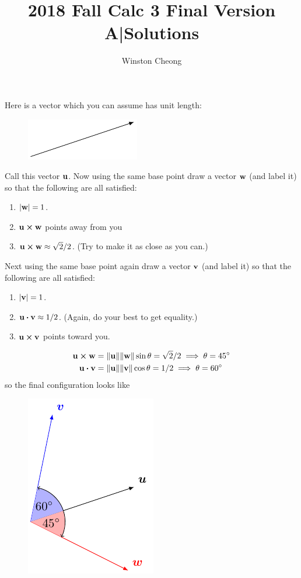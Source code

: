\documentclass[12pt,answers]{exam}
\title{2018 Fall Calc 3 Final Version A|Solutions}
\author{Winston Cheong}
\date{}
\begin{document}
\begin{questions}
	\question Here is a vector which you can assume has unit length:
	\begin{figure}[H]
		\centering
		\vspace{.5in}
		\includegraphics{graphics/2018-fall-final-va-1.pdf}
		\vspace{.5in}
	\end{figure}
	Call this vector $\vb{u}$. Now using the same base point draw a vector $\vb{w}$ (and label it) so that the following are all satisfied:
	\begin{enumerate}[label=(\alph*)]
		\item $|\vb{w}| = 1$.
		\item $\vb{u} \cross \vb{w}$ points away from you
		\item $\vb{u} \cross \vb{w} \approx \sqrt 2/2$. (Try to make it as close as you can.)
	\end{enumerate}
	Next using the same base point again draw a vector $\vb{v}$ (and label it) so that the following are all satisfied:
	\begin{enumerate}[label=(\alph*)]
		\item $|\vb{v}| = 1$.
		\item $\vb{u} \vdot \vb{v} \approx 1/2$. (Again, do your best to get equality.)
		\item $\vb{u} \cross \vb v$ points toward you.
	\end{enumerate}
	\begin{solution}
		\begin{align*}
			\vb u \cross \vb w &= \| \vb u \| \|\vb w\| \sin \theta = \sqrt 2/2 \implies \theta = 45^\circ \\ 
			\vb u \vdot \vb v &= \| \vb u \| \|\vb v\| \cos \theta =  1/2 \implies \theta = 60^\circ
		\end{align*}
		so the final configuration looks like
		\begin{figure}[H]
			\centering
			\includegraphics{graphics/2018-fall-final-va-1-sol.pdf}

\end{figure}
\end{solution}
\end{questions}
\end{document}
